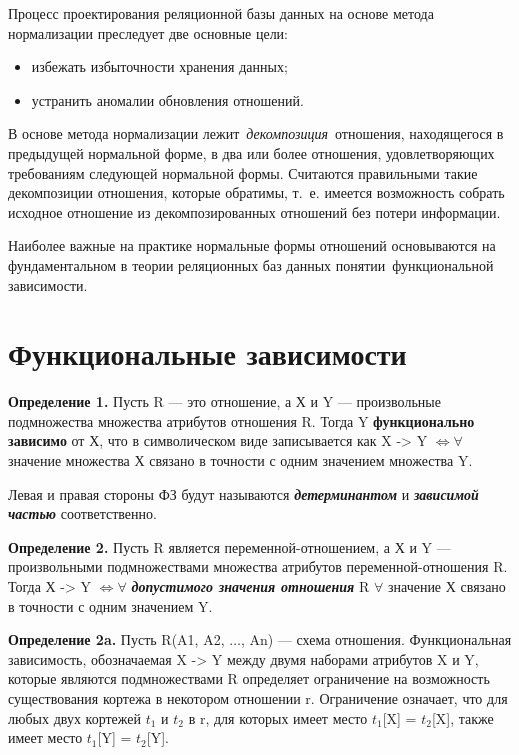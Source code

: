 Процесс проектирования реляционной базы данных на основе метода нормализации преследует две основные цели:

\begin{itemize}[label*=--]
	\item избежать избыточности хранения данных;
	\item устранить аномалии обновления отношений.
\end{itemize}


В основе метода нормализации лежит \textit{декомпозиция} отношения, находящегося в предыдущей нормальной форме, в два или более отношения, удовлетворяющих требованиям следующей нормальной формы. 
Считаются правильными такие декомпозиции отношения, которые обратимы, т.~е. имеется возможность собрать исходное отношение из декомпозированных отношений без потери информации.

Наиболее важные на практике нормальные формы отношений основываются на фундаментальном в теории реляционных баз данных понятии функциональной зависимости.


\section{Функциональные зависимости}

\textbf{Определение 1.} Пусть R --- это отношение, а Х и Y --- произвольные подмножества множества атрибутов отношения R. Тогда Y \textbf{функционально зависимо} от Х, что в символическом виде записывается как X -> Y $\Leftrightarrow \forall$ значение множества Х связано в точности с одним значением множества Y.

Левая и правая стороны ФЗ будут называются \textit{\bfseries детерминантом} и \textit{\bfseries зависимой частью} соответственно.

\textbf{Определение 2.} Пусть R является переменной-отношением, а Х и Y --- произвольными подмножествами множества атрибутов переменной-отношения R. Тогда Х -> Y $\Leftrightarrow \forall$ \textit{\bfseries допустимого значения отношения} R $\forall$ значение Х связано в точности с одним значением Y.

\textbf{Определение 2a.} Пусть R(A1, A2, $\ldots$, An) --- схема отношения. Функциональная зависимость, обозначаемая X -> Y между двумя наборами атрибутов X и Y, которые являются подмножествами R определяет ограничение на возможность существования кортежа в некотором отношении r. Ограничение означает, что для любых двух кортежей $t_1$ и $t_2$ в r, для которых имеет место $t_1$[X] = $t_2$[X], также имеет место $t_1$[Y] = $t_2$[Y].


